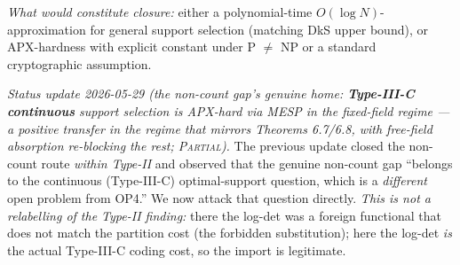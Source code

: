 \documentclass[
]{article}
\begin{document}
\emph{What would constitute closure:} either a polynomial-time
$O(\log N)$-approximation for general support selection (matching
DkS upper bound), or APX-hardness with explicit constant under
P $\neq$ NP or a standard cryptographic assumption.

\emph{Status update 2026-05-29 (the non-count gap's genuine home:
\textbf{Type-III-C continuous} support selection \emph{is} APX-hard via
MESP in the fixed-field regime --- a positive transfer in the regime that
mirrors Theorems 6.7/6.8, with free-field absorption re-blocking the rest;
\textsc{Partial}).} The previous update closed the non-count route
\emph{within Type-II} and observed that the genuine non-count gap
``belongs to the continuous (Type-III-C) optimal-support question, which is
a \emph{different} open problem from OP4.'' We now attack that question
directly. \emph{This is not a relabelling of the Type-II finding:} there
the log-det was a foreign functional that does not match the partition cost
(the forbidden substitution); here the log-det \emph{is} the actual
Type-III-C coding cost, so the import is legitimate.
\end{document}
